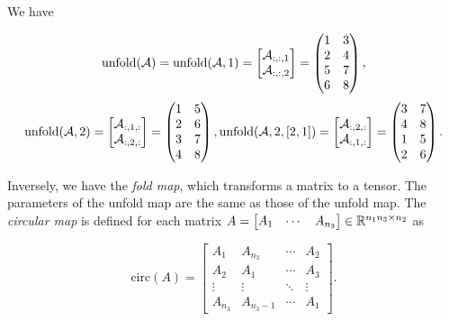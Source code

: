 We have

$$\mathrm{unfold}(\mathcal{A}) = \mathrm{unfold}(\mathcal{A}, 1) = \begin{bmatrix}
        \mathcal{A}_{:,:,1} \\ \mathcal{A}_{:,:,2}
    \end{bmatrix} = \begin{pmatrix}
        1 & 3 \\
        2 & 4 \\
        5 & 7 \\
        6 & 8
    \end{pmatrix},$$
$$\mathrm{unfold}(\mathcal{A}, 2) = \begin{bmatrix}
        \mathcal{A}_{:,1,:} \\ \mathcal{A}_{:,2,:}
    \end{bmatrix} = \begin{pmatrix}
        1 & 5 \\
        2 & 6 \\
        3 & 7 \\
        4 & 8
    \end{pmatrix}, \mathrm{unfold}(\mathcal{A}, 2, [2,1]) = \begin{bmatrix}
        \mathcal{A}_{:,2,:} \\ \mathcal{A}_{:,1,:}
    \end{bmatrix} = \begin{pmatrix}
        3 & 7 \\
        4 & 8 \\
        1 & 5 \\
        2 & 6
    \end{pmatrix}.$$

Inversely, we have the \textit{fold map}, which transforms a matrix to a tensor. The parameters of the unfold map are the same as those of the unfold map. The \textit{circular map} is defined for each matrix $A = \begin{bmatrix}
        A_1 & \cdots & A_{n_3}
    \end{bmatrix} \in {\mathbb{R}}^{n_1n_3\times n_2}$ as

\begin{equation}
    \mathrm{circ}(A) = \begin{bmatrix}
        A_1     & A_{n_3}   & \cdots & A_2    \\
        A_2     & A_1       & \cdots & A_3    \\
        \vdots  & \vdots    & \ddots & \vdots \\
        A_{n_3} & A_{n_3-1} & \cdots & A_1
    \end{bmatrix}.
\end{equation}

